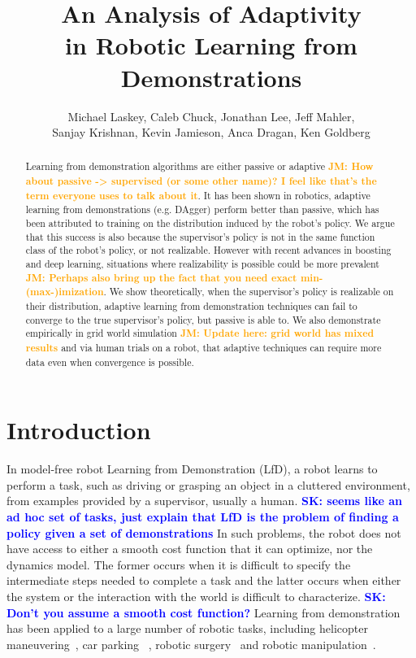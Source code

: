 \documentclass[10pt, conference]{ieeeconf}      %
\title{An Analysis of Adaptivity
 \\in  Robotic Learning from Demonstrations}
\author{Michael Laskey, Caleb Chuck, Jonathan Lee, Jeff Mahler,\\ Sanjay Krishnan, Kevin Jamieson, Anca Dragan, Ken Goldberg}
\newcommand{\sknote}[1]{%
 {\textcolor{blue}{\textbf{SK: #1}}}{}}
\newcommand{\jmnote}[1]{%
 {\textcolor{orange}{\textbf{JM: #1}}}{}}
\begin{document}
\maketitle
\thispagestyle{empty}
\pagestyle{empty}







\begin{abstract}
Learning from demonstration algorithms are either passive or adaptive \jmnote{How about passive -> supervised (or some other name)? I feel like that's the term everyone uses to talk about it}. It has been shown in robotics, adaptive learning from demonstrations (e.g. DAgger) perform better than passive, which has been attributed to training on the distribution induced by the robot's policy. We argue that this success is also because the supervisor's policy  is not in the same function class of the robot's policy, or not realizable. However with recent advances in boosting and deep learning, situations where realizability is possible could be more prevalent \jmnote{Perhaps also bring up the fact that you need exact min-(max-)imization}.  We show theoretically, when the supervisor's policy is realizable on their distribution, adaptive learning from demonstration techniques can fail to converge to the true supervisor's policy, but passive is able to. We also demonstrate empirically in grid world simulation \jmnote{Update here: grid world has mixed results} and via human trials on a robot, that adaptive techniques can require more data even when convergence is possible.
 \end{abstract}


\section{Introduction} 
In model-free robot Learning from Demonstration (LfD), a robot learns to perform a task, such as driving or grasping an object in a cluttered environment, from examples provided by a  supervisor, usually a human. 
\sknote{seems like an ad hoc set of tasks, just explain that LfD is the problem of finding a policy given a set of demonstrations}
In such problems, the robot does not have access to either a smooth cost function that it can optimize, nor the dynamics model. 
The former occurs when it is difficult to specify the intermediate steps needed to complete a task and the latter occurs when either the system or the interaction with the world is difficult to characterize.
\sknote{Don't you assume a smooth cost function?}
Learning from demonstration has been applied to a large number of robotic tasks, including helicopter maneuvering~\cite{abbeel2007application}, car parking~\cite{abbeel2008apprenticeship} , robotic surgery~\cite{van2010superhuman,laskeyshiv} and robotic manipulation~\cite{laskeyrobot}.
\end{document}
